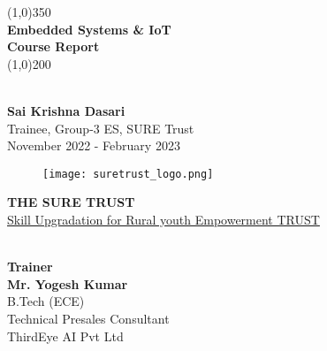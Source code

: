 \documentclass[12pt]{article}
\begin{document}
\begin{titlepage}

	\begin{center}
	
	\line(1,0){350} \\
	[0.25in]
	\huge{\bfseries Embedded Systems \& IoT \\Course Report} \\ [1mm]
	\line(1,0){200}\\
\begin{normalsize}
	\textbf{{\large \\Sai Krishna Dasari\\}}
	{\large Trainee, Group-3 ES}{\large , SURE Trust\\}
	 November 2022 - February 2023
\end{normalsize}

	
	
	
\begin{figure}[h]
\centering
\texttt{[image: suretrust\_logo.png]}
\end{figure}

\textbf{\LARGE {THE SURE TRUST}} \\
\href{https://suretrustforruralyouth.com/}{Skill Upgradation for Rural youth Empowerment  TRUST}\\
\begin{normalsize}
\textbf{\textbf{\\Trainer}}\\
\textbf{Mr. Yogesh Kumar} \\
B.Tech (ECE)\\
Technical Presales Consultant \\ ThirdEye AI Pvt Ltd\\
\end{normalsize}

	\end{center}
	

\end{titlepage}

\end{document}
